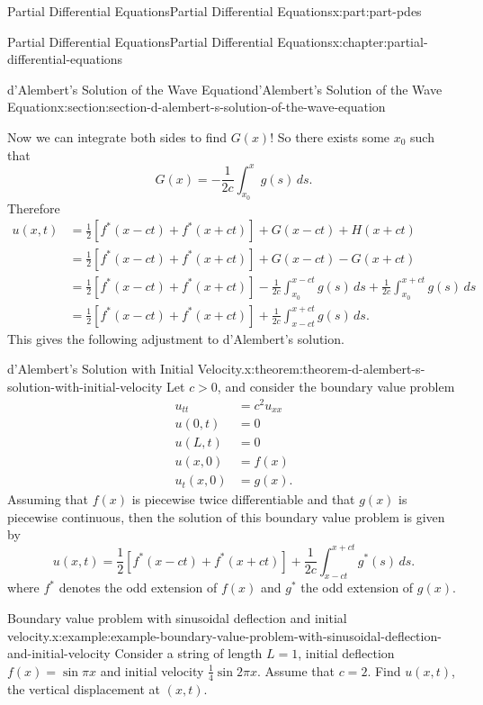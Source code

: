 \documentclass[twoside,10pt,]{book}
\numberwithin{equation}{part}
\newcommand{\gt}{>}
\newcommand{\amp}{&}
\begin{document}
\begin{partptx}{Partial Differential Equations}{}{Partial Differential Equations}{}{}{x:part:part-pdes}
\begin{chapterptx}{Partial Differential Equations}{}{Partial Differential Equations}{}{}{x:chapter:partial-differential-equations}
\begin{sectionptx}{d'Alembert's Solution of the Wave Equation}{}{d'Alembert's Solution of the Wave Equation}{}{}{x:section:section-d-alembert-s-solution-of-the-wave-equation}
%
\par
Now we can integrate both sides to find \(G(x)\)! So there exists some \(x_{0}\) such that%
\begin{equation*}
G(x) = -\frac{1}{2c}\int_{x_{0}}^{x}g(s)\,ds.
\end{equation*}
Therefore%
\begin{align*}
u(x,t) \amp = \frac{1}{2}[f^{*}(x-ct)+f^{*}(x+ct)] + G(x-ct) + H(x+ct) \\
\amp = \frac{1}{2}[f^{*}(x-ct)+f^{*}(x+ct)] + G(x-ct) - G(x+ct) \\
\amp = \frac{1}{2}[f^{*}(x-ct)+f^{*}(x+ct)] - \frac{1}{2c}\int_{x_{0}}^{x-ct}g(s)\,ds + \frac{1}{2c}\int_{x_{0}}^{x+ct}g(s)\,ds \\
\amp = \frac{1}{2}[f^{*}(x-ct)+f^{*}(x+ct)] + \frac{1}{2c}\int_{x-ct}^{x+ct}g(s)\,ds \text{.}
\end{align*}
This gives the following adjustment to d'Alembert's solution.%
\begin{theorem}{d'Alembert's Solution with Initial Velocity.}{}{x:theorem:theorem-d-alembert-s-solution-with-initial-velocity}%
%
Let \(c\gt0\), and consider the boundary value problem%
%
\begin{align*}
u_{tt} \amp = c^{2}u_{xx} \\
u(0,t) \amp = 0 \\
u(L,t) \amp = 0 \\
u(x,0) \amp = f(x) \\
u_{t}(x,0) \amp = g(x). 
\end{align*}
Assuming that \(f(x)\) is piecewise twice differentiable and that \(g(x)\) is piecewise continuous, then the solution of this boundary value problem is given by%
\begin{equation*}
u(x,t) = \frac{1}{2}[f^{*}(x-ct)+f^{*}(x+ct)] + \frac{1}{2c}\int_{x-ct}^{x+ct}g^{*}(s)\,ds.
\end{equation*}
where \(f^{*}\) denotes the odd extension of \(f(x)\) and \(g^{*}\) the odd extension of \(g(x)\).%
\end{theorem}
\begin{example}{Boundary value problem with sinusoidal deflection and initial velocity.}{x:example:example-boundary-value-problem-with-sinusoidal-deflection-and-initial-velocity}%
Consider a string of length \(L=1\), initial deflection \(f(x) = \sin\pi x\) and initial velocity \(\frac{1}{4}\sin2\pi x\). Assume that \(c = 2\). Find \(u(x,t)\), the vertical displacement at \((x,t)\).%
\par\smallskip%

\end{example}
\end{sectionptx}
\end{chapterptx}
\end{partptx}
\end{document}
